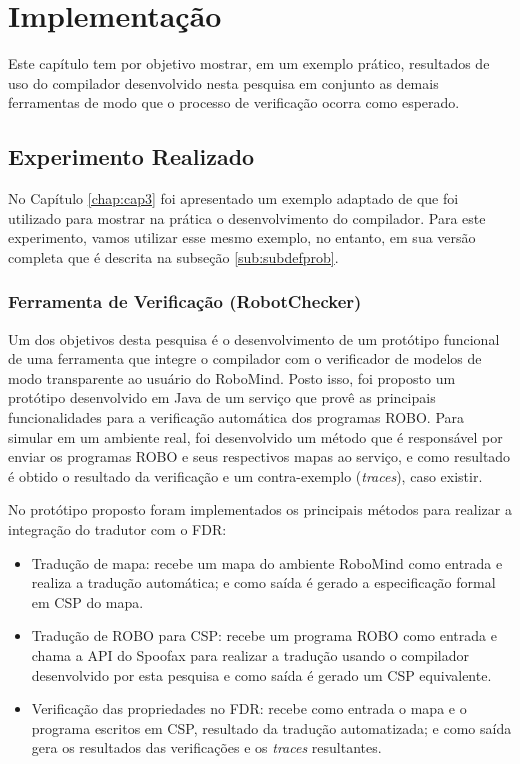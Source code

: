 \chapter{Implementação}

Este capítulo tem por objetivo mostrar, em um exemplo prático, resultados de uso do compilador desenvolvido nesta pesquisa em conjunto as demais ferramentas de modo que o processo de verificação ocorra como esperado.

\section{Experimento Realizado}
\label{sub:exper}

No Capítulo \ref{chap:cap3} foi apresentado um exemplo adaptado de \cite{furb} que foi utilizado para mostrar na prática o desenvolvimento do compilador. Para este experimento, vamos utilizar esse mesmo exemplo, no entanto, em sua versão completa que é descrita na subseção \ref{sub:subdefprob}.

\subsection{Ferramenta de Verificação (RobotChecker)}
\label{sub:robotch}

Um dos objetivos desta pesquisa é o desenvolvimento de um protótipo funcional de uma ferramenta que integre o compilador com o verificador de modelos de modo transparente ao usuário do RoboMind. Posto isso, foi proposto um protótipo desenvolvido em Java de um serviço que provê as principais funcionalidades para a verificação automática dos programas ROBO. Para simular em um ambiente real, foi desenvolvido um método que é responsável por enviar os programas ROBO e seus respectivos mapas ao serviço, e como resultado é obtido o resultado da verificação e um contra-exemplo (\textit{traces}), caso existir.

No protótipo proposto foram implementados os principais métodos para realizar a integração do tradutor com o FDR:
\begin{itemize}
    \item Tradução de mapa: recebe um mapa do ambiente RoboMind como entrada e realiza a tradução automática; e como saída é gerado a especificação formal em CSP do mapa.
    \item Tradução de ROBO para CSP: recebe um programa ROBO como entrada e chama a API do Spoofax para realizar a tradução usando o compilador desenvolvido por esta pesquisa e como saída é gerado um CSP equivalente.
    \item Verificação das propriedades no FDR: recebe como entrada o mapa e o programa escritos em CSP, resultado da tradução automatizada; e como saída gera os resultados das verificações e os \textit{traces} resultantes.
\end{itemize}


